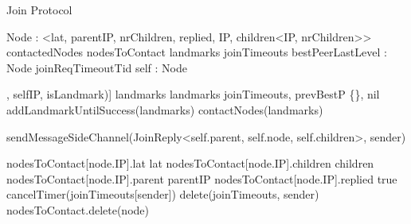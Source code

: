 
\begin{algorithm}{}
\caption{Join Protocol} \label{alg:memb:join}
\begin{algorithmic}[1]
    \asdtypes
        \State Node : <lat, parentIP, nrChildren, replied, IP, children<IP,  nrChildren>>
    \asdend
    \asdstate \label{alg:memb:join:state}
        \State contactedNodes 
        \State nodesToContact 
        \State landmarks 
        \State joinTimeouts 
        \State bestPeerLastLevel : Node 
        \State joinReqTimeoutTid 
        \State self : Node 
    \asdend

\asdupon[Init(landmarks : IP[], selfIP, isLandmark)] \label{alg:memb:join:init}
    \State landmarks \asdassign landmarks 
    \State joinTimeouts, prevBestP \asdassign \{\}, nil
    {addLandmarkUntilSuccess(landmarks) \label{alg:memb:join:add_land}} 
    {contactNodes(landmarks) \label{alg:memb:join:contact_landm}} 
\asdend


 \label{alg:memb:join:recv_join}
    \State sendMessageSideChannel(JoinReply<self.parent, self.node, self.children>, sender) 
\asdend
    
  \label{alg:memb:join:recv_join_reply}
            \State nodesToContact[node.IP].lat \asdassign lat
            \State nodesToContact[node.IP].children \asdassign children
            \State nodesToContact[node.IP].parent \asdassign parentIP
            \State nodesToContact[node.IP].replied \asdassign true
            \State cancelTimer(joinTimeouts[sender])
            \State delete(joinTimeouts, sender)
        \Else
            \State nodesToContact.delete(node)
        \EndIf
\asdend


\end{algorithmic}
\end{algorithm}
